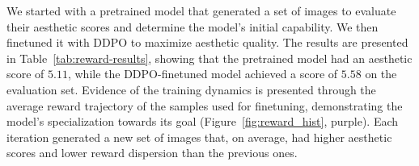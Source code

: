 \noindent We started with a pretrained model that generated a set of images to evaluate their aesthetic scores and determine the model's initial capability. We then finetuned it with DDPO to maximize aesthetic quality. The results are presented in Table~\ref{tab:reward-results}, showing that the pretrained model had an aesthetic score of $5.11$, while the DDPO-finetuned model achieved a score of $5.58$ on the evaluation set. Evidence of the training dynamics is presented through the average reward trajectory of the samples used for finetuning, demonstrating the model's specialization towards its goal (Figure~\ref{fig:reward_hist}, purple). Each iteration generated a new set of images that, on average, had higher aesthetic scores and lower reward dispersion than the previous ones.


